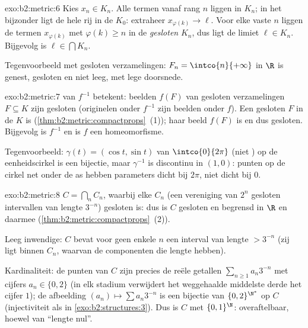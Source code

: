 \begin{solution}{exo:b2:metric:6}
Kies $x_n \in K_n$. Alle termen vanaf rang $n$ liggen in $K_n$; in
het bijzonder ligt de hele rij in de  $K_0$: extraheer
$x_{\varphi(k)} \to \ell$. Voor elke vaste $n$ liggen de termen
$x_{\varphi(k)}$ met $\varphi(k) \geq n$ in de \emph{gesloten}
$K_n$, dus ligt de limiet $\ell \in K_n$. Bijgevolg is $\ell \in
\bigcap K_n$.

Tegenvoorbeeld met gesloten verzamelingen: $F_n =
\intco{n}{+\infty}$ in $\R$ is genest, gesloten en niet leeg, met
lege doorsnede.
\end{solution}

\begin{solution}{exo:b2:metric:7}
 van $f^{-1}$ betekent: beelden $f(F)$ van gesloten
verzamelingen $F \subseteq K$ zijn gesloten (originelen onder
$f^{-1}$ zijn beelden onder $f$). Een gesloten $F$ in de 
$K$ is  (\cref{thm:b2:metric:compactprops}~(1)); haar
 beeld $f(F)$ is  en dus gesloten. Bijgevolg is
$f^{-1}$  en is $f$ een homeomorfisme.

Tegenvoorbeeld: $\gamma(t) = (\cos t, \sin t)$ van
$\intco{0}{2\pi}$ (niet ) op de eenheidscirkel is een
 bijectie, maar $\gamma^{-1}$ is discontinu in $(1,0)$:
punten op de cirkel net onder de as hebben parameters dicht bij
$2\pi$, niet dicht bij $0$.
\end{solution}

\begin{solution}{exo:b2:metric:8}
$C = \bigcap_n C_n$, waarbij elke $C_n$ (een vereniging van $2^n$
gesloten intervallen van lengte $3^{-n}$) gesloten is: dus is $C$
gesloten en begrensd in $\R$ en daarmee 
(\cref{thm:b2:metric:compactprops}~(2)).

Leeg inwendige: $C$ bevat voor geen enkele $n$ een interval van
lengte $> 3^{-n}$ (zij ligt binnen $C_n$, waarvan de componenten
die lengte hebben).

Kardinaliteit: de punten van $C$ zijn precies de reële getallen
$\sum_{n\geq1} a_n 3^{-n}$ met cijfers $a_n \in \{0, 2\}$ (in elk
stadium verwijdert het weggehaalde middelste derde het cijfer $1$);
de afbeelding $(a_n) \mapsto \sum a_n 3^{-n}$ is een bijectie van
$\{0,2\}^{\N^*}$ op $C$ (injectiviteit als in
\cref{exo:b2:structures:3}). Dus is $C$  met
$\{0,1\}^{\N}$: overaftelbaar, hoewel van ``lengte nul''.
\end{solution}

